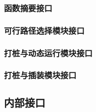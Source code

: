 \documentclass{article}
\begin{document}
			\subsubsection{函数摘要接口}
				
			\subsubsection{可行路径选择模块接口}
			
			\subsubsection{打桩与动态运行模块接口}
			
			\subsubsection{打桩与插装模块接口}
			
		\subsection{内部接口}
				
	
			
\end{document}
